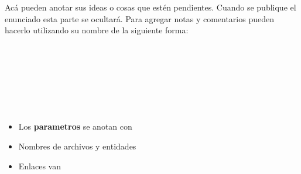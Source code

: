 \label{sec:todo}

Acá pueden anotar sus ideas o cosas que estén pendientes. Cuando se publique el enunciado esta parte se ocultará. Para agregar notas y comentarios pueden hacerlo utilizando su nombre de la siguiente forma:

\begin{center}
    \\
     \\
     \\
    \\
    \\
    \\
\end{center}

\begin{itemize}
    \item Los \textbf{parametros} se anotan con 
    \item Nombres de archivos y entidades 
    \item Enlaces van 
\end{itemize}



\newpage